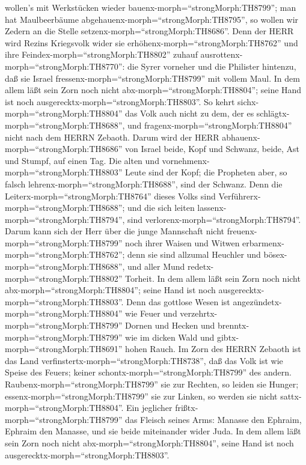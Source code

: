 wollen's mit Werkstücken wieder bauenx-morph=``strongMorph:TH8799''; man
hat Maulbeerbäume abgehauenx-morph=``strongMorph:TH8795'', so wollen wir
Zedern an die Stelle setzenx-morph=``strongMorph:TH8686''. 
Denn der HERR wird Rezins Kriegsvolk wider sie
erhöhenx-morph=``strongMorph:TH8762'' und ihre
Feindex-morph=``strongMorph:TH8802'' zuhauf
ausrottenx-morph=``strongMorph:TH8770'':  die Syrer
vorneher und die Philister hintenzu, daß sie Israel
fressenx-morph=``strongMorph:TH8799'' mit vollem Maul. In dem allem läßt
sein Zorn noch nicht abx-morph=``strongMorph:TH8804''; seine Hand ist
noch ausgerecktx-morph=``strongMorph:TH8803''.  So kehrt
sichx-morph=``strongMorph:TH8804'' das Volk auch nicht zu dem, der es
schlägtx-morph=``strongMorph:TH8688'', und
fragenx-morph=``strongMorph:TH8804'' nicht nach dem HERRN Zebaoth.
 Darum wird der HERR abhauenx-morph=``strongMorph:TH8686''
von Israel beide, Kopf und Schwanz, beide, Ast und Stumpf, auf einen
Tag.  Die alten und vornehmenx-morph=``strongMorph:TH8803''
Leute sind der Kopf; die Propheten aber, so falsch
lehrenx-morph=``strongMorph:TH8688'', sind der Schwanz. 
Denn die Leiterx-morph=``strongMorph:TH8764'' dieses Volks sind
Verführerx-morph=``strongMorph:TH8688''; und die sich leiten
lassenx-morph=``strongMorph:TH8794'', sind
verlorenx-morph=``strongMorph:TH8794''.  Darum kann sich
der Herr über die junge Mannschaft nicht
freuenx-morph=``strongMorph:TH8799'' noch ihrer Waisen und Witwen
erbarmenx-morph=``strongMorph:TH8762''; denn sie sind allzumal Heuchler
und bösex-morph=``strongMorph:TH8688'', und aller Mund
redetx-morph=``strongMorph:TH8802'' Torheit. In dem allem läßt sein Zorn
noch nicht abx-morph=``strongMorph:TH8804''; seine Hand ist noch
ausgerecktx-morph=``strongMorph:TH8803''.  Denn das
gottlose Wesen ist angezündetx-morph=``strongMorph:TH8804'' wie Feuer
und verzehrtx-morph=``strongMorph:TH8799'' Dornen und Hecken und
brenntx-morph=``strongMorph:TH8799'' wie im dicken Wald und
gibtx-morph=``strongMorph:TH8691'' hohen Rauch.  Im Zorn
des HERRN Zebaoth ist das Land
verfinstertx-morph=``strongMorph:TH8738'', daß das Volk ist wie Speise
des Feuers; keiner schontx-morph=``strongMorph:TH8799'' des andern.
 Raubenx-morph=``strongMorph:TH8799'' sie zur Rechten, so
leiden sie Hunger; essenx-morph=``strongMorph:TH8799'' sie zur Linken,
so werden sie nicht sattx-morph=``strongMorph:TH8804''. Ein jeglicher
frißtx-morph=``strongMorph:TH8799'' das Fleisch seines Arms:
 Manasse den Ephraim, Ephraim den Manasse, und sie beide
miteinander wider Juda. In dem allem läßt sein Zorn noch nicht
abx-morph=``strongMorph:TH8804'', seine Hand ist noch
ausgerecktx-morph=``strongMorph:TH8803''.

